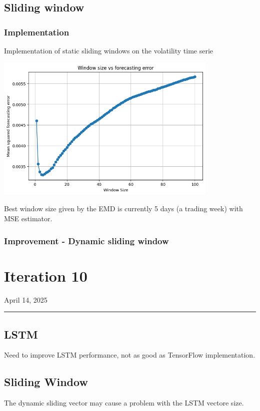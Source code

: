 \documentclass[letterpaper,11pt]{article}
\begin{document}
\subsection*{Sliding window}
\subsubsection*{Implementation}
Implementation of static sliding windows on the volatility time serie 
  \begin{center}
  \includegraphics[width=0.8\textwidth]{img/win_err.png}
  \end{center} %
  Best window size given by the EMD is currently 5 days (a trading week) with MSE estimator.


\subsubsection*{Improvement - Dynamic sliding window}




\newpage
\section*{Iteration 10}
\begin{flushright}
April 14, 2025
\end{flushright}
\hrule
\vspace{0.2in}

\subsection*{LSTM}
Need to improve LSTM performance, not as good as TensorFlow implementation.

\subsection*{Sliding Window}
The dynamic sliding vector may cause a problem with the LSTM vectore size.
\end{document}
